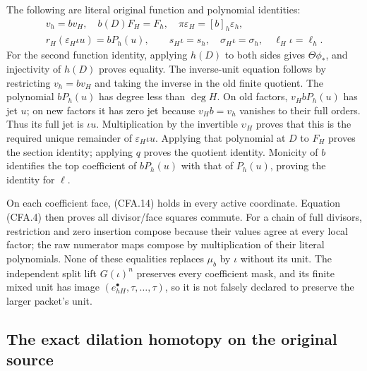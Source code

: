 The following are literal original function and polynomial identities:
\[
\begin{gathered}
 v_h=bv_H,\quad b(D)F_H=F_h,\quad
 \pi\varepsilon_H=[b]_h\varepsilon_h,\\
 r_H(\varepsilon_H\iota u)=bP_h(u),\qquad
 s_H\iota=s_h,\quad\sigma_H\iota=\sigma_h,\quad
 \ell_H\iota=\ell_h.
\end{gathered}                                                 \tag{CFA.14}
\]
For the second function identity, applying $h(D)$ to both sides
gives $\Theta\phi_*$, and injectivity of $h(D)$ proves equality.
The inverse-unit equation follows by restricting
$v_h=bv_H$ and taking the inverse in the old finite quotient.
The polynomial $bP_h(u)$ has degree less than $\deg H$.
On old factors, $v_H bP_h(u)$ has jet $u$; on new factors it has
zero jet because $v_Hb=v_h$ vanishes to their full orders.
Thus its full jet is $\iota u$.  Multiplication by the invertible
$\upsilon_H$ proves that this is the required unique remainder
of $\varepsilon_H\iota u$.  Applying that polynomial at $D$ to
$F_H$ proves the section identity; applying $q$ proves the quotient
identity.  Monicity of $b$ identifies the top coefficient of
$bP_h(u)$ with that of $P_h(u)$, proving the identity for $\ell$.

On each coefficient face, (CFA.14) holds in every active coordinate.
Equation (CFA.4) then proves all divisor/face squares commute.
For a chain of full divisors, restriction and zero insertion compose
because their values agree at every local factor; the raw numerator
maps compose by multiplication of their literal polynomials.  None
of these equalities replaces $\mu_b$ by $\iota$ without its unit.
The independent split lift $G(\iota)^n$ preserves every coefficient
mask, and its finite mixed unit has image
$(e_{hH}^\bullet,\tau,\ldots,\tau)$, so it is not falsely declared
to preserve the larger packet's unit.

\subsection{The exact dilation homotopy on the original source}


